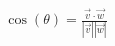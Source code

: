 \documentclass[preview]{standalone}
\begin{document}
\begin{align*}
\cos(\theta) = \frac{\vec{v} \cdot \vec{w}}{|\vec{v}| |\vec{w}|}
\end{align*}
\end{document}
